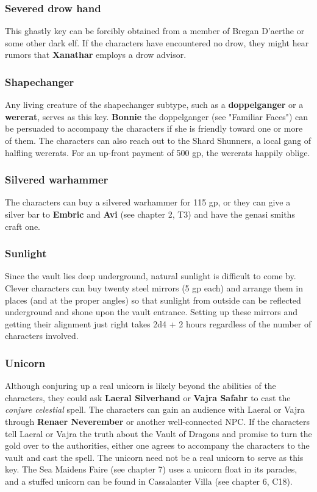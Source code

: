 \documentclass[10pt,a4paper,twoside,twocolumn,openany,nodeprecatedcode]{dndbook}
\begin{document}
\subsubsection{Severed drow hand}
This ghastly key can be forcibly obtained from a member of Bregan D'aerthe or some other dark elf. If the characters have encountered no drow, they might hear rumors that \textbf{Xanathar} employs a drow advisor.
\subsubsection{Shapechanger}
Any living creature of the shapechanger subtype, such as a \textbf{doppelganger} or a \textbf{wererat}, serves as this key. \textbf{Bonnie} the doppelganger (see "Familiar Faces") can be persuaded to accompany the characters if she is friendly toward one or more of them. The characters can also reach out to the Shard Shunners, a local gang of halfling wererats. For an up-front payment of 500 gp, the wererats happily oblige.
\subsubsection{Silvered warhammer}
The characters can buy a silvered warhammer for 115 gp, or they can give a silver bar to \textbf{Embric} and \textbf{Avi} (see chapter 2, T3) and have the genasi smiths craft one.
\subsubsection{Sunlight}
Since the vault lies deep underground, natural sunlight is difficult to come by. Clever characters can buy twenty steel mirrors (5 gp each) and arrange them in places (and at the proper angles) so that sunlight from outside can be reflected underground and shone upon the vault entrance. Setting up these mirrors and getting their alignment just right takes 2d4 + 2 hours regardless of the number of characters involved.
\subsubsection{Unicorn}
Although conjuring up a real unicorn is likely beyond the abilities of the characters, they could ask \textbf{Laeral Silverhand} or \textbf{Vajra Safahr} to cast the \textit{conjure celestial} spell. The characters can gain an audience with Laeral or Vajra through \textbf{Renaer Neverember} or another well-connected NPC. If the characters tell Laeral or Vajra the truth about the Vault of Dragons and promise to turn the gold over to the authorities, either one agrees to accompany the characters to the vault and cast the spell. The unicorn need not be a real unicorn to serve as this key. The Sea Maidens Faire (see chapter 7) uses a unicorn float in its parades, and a stuffed unicorn can be found in Cassalanter Villa (see chapter 6, C18).
\end{document}
